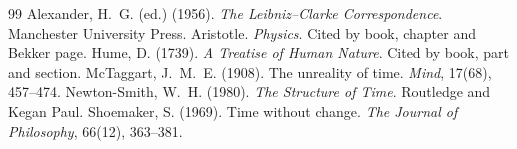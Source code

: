 \documentclass{situationist-preprint}
\begin{document}
\begin{thebibliography}{99}\small
{} Alexander, H.~G. (ed.) (1956). \emph{The Leibniz--Clarke Correspondence}. Manchester University Press.
 Aristotle. \emph{Physics}. Cited by book, chapter and Bekker page.
 Hume, D. (1739). \emph{A Treatise of Human Nature}. Cited by book, part and section.
 McTaggart, J.~M.~E. (1908). The unreality of time. \emph{Mind}, 17(68), 457--474.
 Newton-Smith, W.~H. (1980). \emph{The Structure of Time}. Routledge and Kegan Paul.
 Shoemaker, S. (1969). Time without change. \emph{The Journal of Philosophy}, 66(12), 363--381.
\end{thebibliography}
\end{document}
